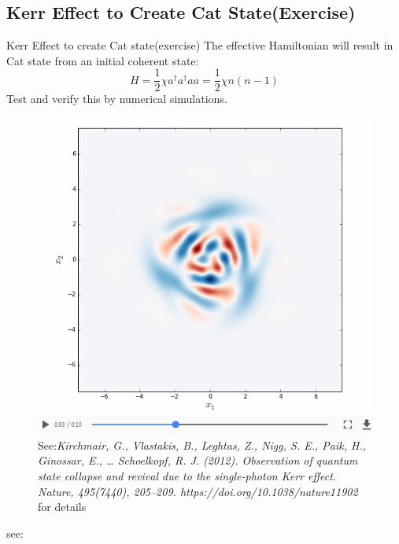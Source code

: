 \documentclass{beamer}
\begin{document}
\subsection{Kerr Effect to Create Cat State(Exercise)}
\begin{frame}{Kerr Effect to create Cat state(exercise)}
The effective Hamiltonian will result in Cat state from an initial coherent state:
\[H = \frac{1}{2}\chi {a^\dag }{a^\dag }aa = \frac{1}{2}\chi n\left( {n - 1} \right)\]
Test and verify this by numerical simulations.
\begin{figure}
	\centering
	\includegraphics[width=0.3\linewidth]{screenshot002}
	\caption{See:\emph{Kirchmair, G., Vlastakis, B., Leghtas, Z., Nigg, S. E., Paik, H., Ginossar, E., … Schoelkopf, R. J. (2012). Observation of quantum state collapse and revival due to the single-photon Kerr effect. Nature, 495(7440), 205–209. https://doi.org/10.1038/nature11902} for details}
	\label{fig:screenshot002}
\end{figure}
see:
\end{frame}
\end{document}
